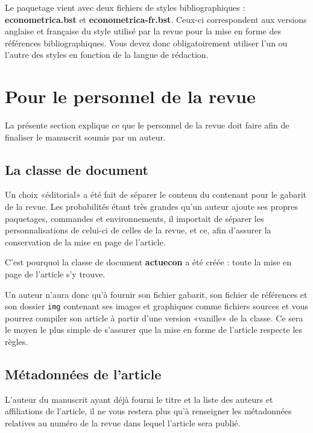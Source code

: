 \documentclass[french]{article}
\begin{document}
				Le paquetage vient avec deux fichiers de styles bibliographiques : \textbf{econometrica.bst} et 
				\textbf{econometrica-fr.bst}. Ceux-ci correspondent aux versions anglaise et française du style utilisé
				par la revue pour la mise en forme des références bibliographiques. Vous devez donc obligatoirement utiliser
				l'un ou l'autre des styles en fonction de la langue de rédaction.
	
	\section{Pour le personnel de la revue}
		\label{sec:personnel}
		
		La présente section explique ce que le personnel de la revue doit faire afin de finaliser le manuscrit soumis
		par un auteur.
		
		\subsection{La classe de document}
		
			Un choix «éditorial» a été fait de séparer le contenu du contenant pour le gabarit de la revue. Les probabilités
			étant très grandes qu'un auteur ajoute ses propres paquetages, commandes et environnements, il importait de
			séparer les personnalisations de celui-ci de celles de la revue, et ce, afin d'assurer la conservation de la mise en page de l'article.
			
			C'est pourquoi la classe de document \textbf{actuecon} a été créée : toute la mise en page de l'article s'y trouve.
			
			Un auteur n'aura donc qu'à fournir son fichier gabarit, son fichier de références et son dossier \texttt{img}
			contenant ses images et graphiques comme fichiers sources et vous pourrez compiler son article à partir d'une
			version «vanille» de la classe. Ce sera le moyen le plus simple de s'assurer que la mise en forme de l'article
			respecte les règles.
			
		\subsection{Métadonnées de l'article}
		
			L'auteur du manuscrit ayant déjà fourni le titre et la liste des auteurs et affiliations de l'article, il ne vous
			restera plus qu'à renseigner les métadonnées relatives au numéro de la revue dans lequel l'article sera publié.
			
\end{document}
